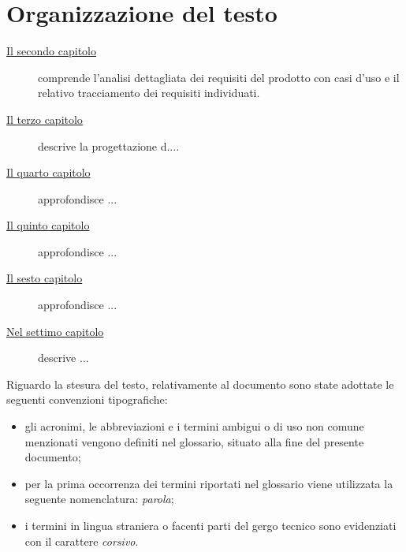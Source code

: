 \section{Organizzazione del testo}

\begin{description}
    \item[{\hyperref[cap:analisi-requisiti]{Il secondo capitolo}}] comprende l'analisi dettagliata dei requisiti del prodotto con casi d'uso e il relativo tracciamento dei requisiti individuati.
    
    \item[{\hyperref[cap:progettazione]{Il terzo capitolo}}] descrive la progettazione d....
    
    \item[{\hyperref[cap:analisi-requisiti]{Il quarto capitolo}}] approfondisce ...
    
    \item[{\hyperref[cap:progettazione-codifica]{Il quinto capitolo}}] approfondisce ...
    
    \item[{\hyperref[cap:verifica-validazione]{Il sesto capitolo}}] approfondisce ...
    
    \item[{\hyperref[cap:conclusioni]{Nel settimo capitolo}}] descrive ...
\end{description}

Riguardo la stesura del testo, relativamente al documento sono state adottate le seguenti convenzioni tipografiche:
\begin{itemize}
	\item gli acronimi, le abbreviazioni e i termini ambigui o di uso non comune menzionati vengono definiti nel glossario, situato alla fine del presente documento;
	\item per la prima occorrenza dei termini riportati nel glossario viene utilizzata la seguente nomenclatura: \emph{parola}\glsfirstoccur;
	\item i termini in lingua straniera o facenti parti del gergo tecnico sono evidenziati con il carattere \emph{corsivo}.
\end{itemize}